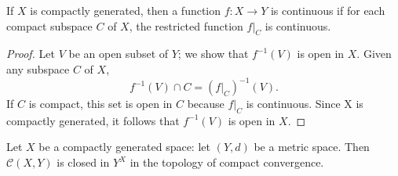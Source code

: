\begin{lemma}
  If \( X \) is compactly generated, then a function \( f: X \to Y \) is continuous if for each compact subspace \( C \) of \( X \), the restricted function \( \left. f \right\vert_C \) is continuous.
\end{lemma}
\begin{proof}
  Let \( V \) be an open subset of \( Y \);
  we show that \( f^{-1}(V) \) is open in \( X \).
  Given any subspace \( C \) of \( X \),
  \[
    f^{-1}(V) \cap C = (\left. f \right\vert_C)^{-1}(V).
  \]
  If \( C \) is compact, this set is open in \( C \) because \( \left. f \right\vert_C \) is continuous.
  Since X is compactly generated, it follows that \( f^{-1}(V) \) is open in \( X \).
\end{proof}

\begin{theorem}
  Let \( X \) be a compactly generated space: let \( (Y, d) \) be a metric space.
  Then \( \mathcal{C}(X, Y) \) is closed in \( Y^X \) in the topology of compact convergence.
\end{theorem}
